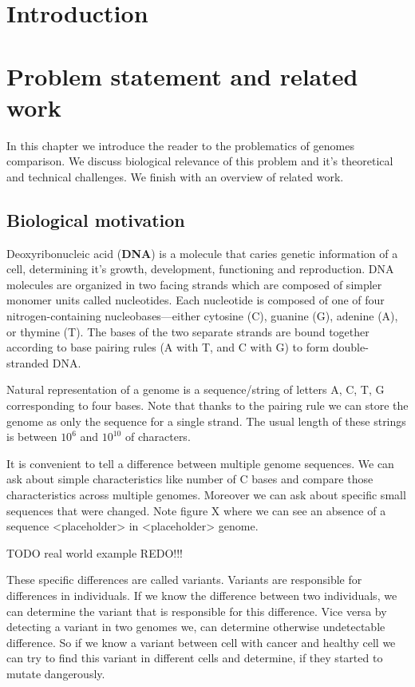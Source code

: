 \chapter*{Introduction}

\chapter{Problem statement and related work}
In this chapter we introduce the reader to the problematics of genomes comparison. 
We discuss biological relevance of this problem and it's theoretical and technical challenges. 
We finish with an overview of related work.

\section{Biological motivation}

Deoxyribonucleic acid (\textbf{DNA}) is a molecule that caries genetic information of a cell, 
determining it's growth, development, functioning and reproduction. 
DNA molecules are organized in two facing strands which are composed of simpler monomer units called nucleotides.
Each nucleotide is composed of one of four nitrogen-containing nucleobases—either cytosine (C), guanine (G), adenine (A), or thymine (T).
The bases of the two separate strands are bound together according to base pairing rules (A with T, and C with G) to form double-stranded DNA. 

Natural representation of a genome is a sequence/string of letters A, C, T, G corresponding to four bases. 
Note that thanks to the pairing rule we can store the genome as only the sequence for a single strand. 
The usual length of these strings is between $10^6$ and $10^{10}$
of characters.

It is convenient to tell a difference between multiple genome sequences. 
We can ask about simple characteristics like number of C bases and compare those characteristics across multiple genomes. 
Moreover we can ask about specific small sequences that were changed. Note figure X where we can see an absence of a sequence <placeholder> in <placeholder> genome.  

TODO real world example REDO!!!

These specific differences are called variants.
Variants are responsible for differences in individuals.
If we know the difference between two individuals, we can determine the variant that is responsible for this difference. 
Vice versa by detecting a variant in two genomes we, can determine otherwise undetectable difference.
So if we know a variant between cell with cancer and healthy cell we can try to find this variant in different cells and determine, if they started to mutate dangerously.

